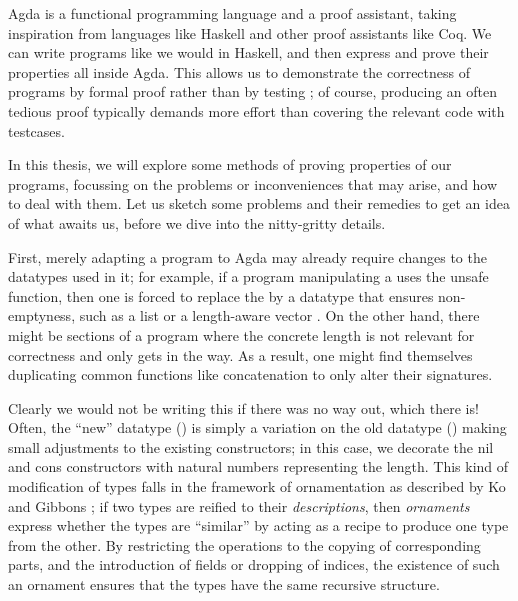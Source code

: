 Agda \cite{agda} is a functional programming language and a proof assistant, taking inspiration from languages like Haskell and other proof assistants like Coq. We can write programs like we would in Haskell, and then express and prove their properties all inside Agda. This allows us to demonstrate the correctness of programs by formal proof %
rather than by testing%
; of course, producing an often tedious proof typically demands more effort than covering the relevant code with testcases.

In this thesis, we will explore some methods of proving properties of our programs, focussing on the problems or inconveniences that may arise, and how to deal with them. Let us sketch some problems and their remedies to get an idea of what awaits us, before we dive into the nitty-gritty details.

First, merely adapting a program to Agda may already require changes to the datatypes used in it; for example, if a program manipulating a  uses the unsafe  function, then one is forced to replace the  by a datatype that ensures non-emptyness, such as a  list or a length-aware vector . On the other hand, there might be sections of a program where the concrete length is not relevant for correctness and only gets in the way. As a result, one might find themselves duplicating common functions like concatenation \AgdaFunction{\_++\_} to only alter their signatures.

Clearly we would not be writing this if there was no way out, which there is! Often, the ``new'' datatype () is simply a variation on the old datatype () making small adjustments to the existing constructors; in this case, we decorate the nil and cons constructors with natural numbers representing the length. This kind of modification of types falls in the framework of ornamentation as described by Ko and Gibbons \cite{progorn}; if two types are reified to their \textit{descriptions}, then \textit{ornaments} express whether the types are ``similar'' by acting as a recipe to produce one type from the other. By restricting the operations to the copying of corresponding parts, and the introduction of fields or dropping of indices, the existence of such an ornament ensures that the types have the same recursive structure.


